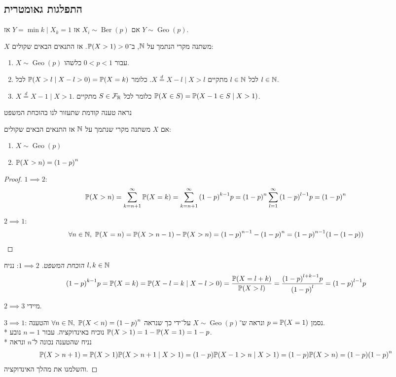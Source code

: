 \subsection{התפלגות גאומטרית}
\begin{proposition}
	אם $X_i \sim \operatorname{Ber}(p)$ אז $Y = \min{k \mid X_k = 1}$ אז $Y \sim \operatorname{Geo}(p)$.
\end{proposition}
\begin{theorem}
	$X$ משתנה מקרי הנתמך על $\mathbb{N}$, ב־$\mathbb{P}(X > 1) > 0$.
	אז התנאים הבאים שקולים:
	\begin{enumerate}
		\item $X \sim \operatorname{Geo}(p)$ עבור $0 < p < 1$ כלשהו.
		\item לכל $l \in \mathbb{N}$ מתקיים $X \overset{d}{=} X - l \mid X > l$. כלומר $\mathbb{P}(X > l \mid X - l > 0) = \mathbb{P}(X = k)$ לכל $l \in \mathbb{N}$.
		\item $X \overset{d}{=} X - 1 \mid X > 1$. כלומר לכל $S \in \mathcal{F}_{\mathbb{R}}$ מתקיים $\mathbb{P}(X \in S) = \mathbb{P}(X - 1 \in S \mid X > 1)$.
	\end{enumerate}
\end{theorem}
נראה טענה קודמת שתעזור לנו בהוכחת המשפט
\begin{proposition}
	אם $X$ משתנה מקרי שנתמך על $\mathbb{N}$ אז התנאים הבאים שקולים:
	\begin{enumerate}
		\item $X \sim \operatorname{Geo}(p)$
		\item $\mathbb{P}(X > n) = {(1 - p)}^n$
	\end{enumerate}
\end{proposition}
\begin{proof}
	$1 \implies 2$:
	\[
		\mathbb{P}(X > n)
		= \sum_{k = n + 1}^{\infty} \mathbb{P}(X = k)
		= \sum_{k = n + 1}^{\infty} {(1 - p)}^{k - 1} p
		= {(1 - p)}^n \sum_{l = 1}^{\infty} {(1 - p)}^{l - 1} p
		= {(1 - p)}^n
	\]

	$2 \implies 1$:
	\[
		\forall n \in \mathbb{N},\ \mathbb{P}(X = n)
		= \mathbb{P}(X > n - 1) - \mathbb{P}(X > n)
		= {(1 - p)}^{n - 1} - {(1 - p)}^n
		= {(1 - p)}^{n - 1} (1 - (1 - p))
	\]
\end{proof}
\begin{proof}[הוכחת המשפט]
	$1 \implies 2$:
	נניח $l, k \in \mathbb{N}$
	\[
		{(1 - p)}^{k - 1} p
		= \mathbb{P}(X = k)
		= \mathbb{P}(X - l = k \mid X - l > 0)
		= \frac{\mathbb{P}(X = l + k)}{\mathbb{P}(X > l)}
		= \frac{{(1 - p)}^{l + k - 1} p}{{(1 - p)}^l}
		= {(1 - p)}^{l - 1} p
	\]

	$2 \implies 3$ מיידי.

	$3 \implies 1$:
	נסמן $p = \mathbb{P}(X = 1)$ ונראה ש־$X \sim \operatorname{Geo}(p)$ על־ידי כך שנראה $\forall n \in \mathbb{N},\ \mathbb{P}(X < n) = {(1 - p)}^n$ והטענה. \\*
	נוכיח באינדוקציה. עבור $n = 1$ נובע $\mathbb{P}(X > 1) = 1 - \mathbb{P}(X = 1) = 1 - p$. \\*
	נניח שהטענה נכונה ל־$n$ ונראה
	\[
		\mathbb{P}(X > n + 1)
		= \mathbb{P}(X > 1) \mathbb{P}(X > n + 1 \mid X > 1)
		= (1 - p) \mathbb{P}(X - 1 > n \mid X > 1)
		= (1 - p) \mathbb{P}(X > n)
		= (1 - p) {(1 - p)}^n
	\]
	והשלמנו את מהלך האינדוקציה.
\end{proof}


